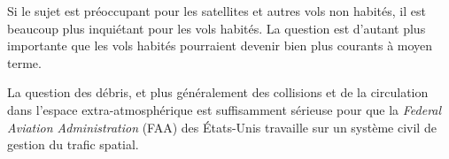 	
	Si le sujet est préoccupant pour les satellites et autres vols non habités, il est beaucoup plus inquiétant pour les vols habités. La question est d'autant plus importante que les vols habités pourraient devenir bien plus courants à moyen terme\footnotemark.
	
	
	La question des débris, et plus généralement des collisions et de la circulation dans l'espace extra-atmosphérique est suffisamment sérieuse pour que la \emph{Federal Aviation Administration} (FAA) des États-Unis travaille sur un système civil de gestion du trafic spatial\footnotemark.
	
	
